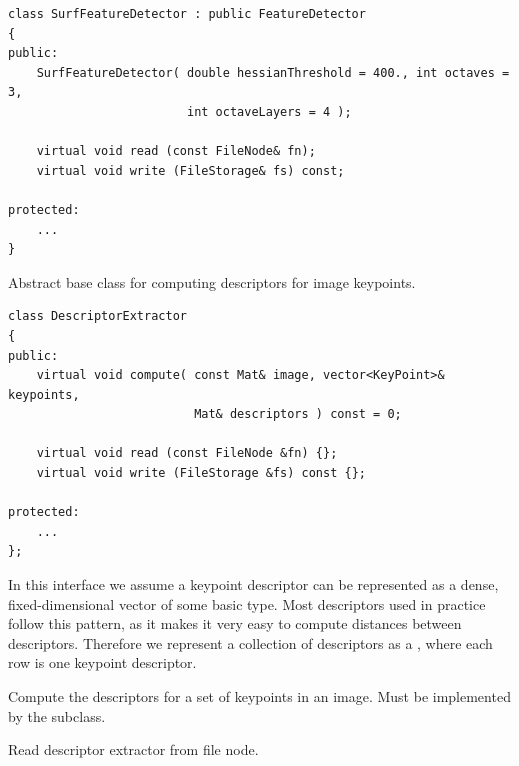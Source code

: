 \begin{lstlisting}
class SurfFeatureDetector : public FeatureDetector
{
public:
    SurfFeatureDetector( double hessianThreshold = 400., int octaves = 3,
                         int octaveLayers = 4 );
    
    virtual void read (const FileNode& fn);
    virtual void write (FileStorage& fs) const;
    
protected:
	...
}
\end{lstlisting}

Abstract base class for computing descriptors for image keypoints.

\begin{lstlisting}
class DescriptorExtractor
{
public:
    virtual void compute( const Mat& image, vector<KeyPoint>& keypoints,
                          Mat& descriptors ) const = 0;

    virtual void read (const FileNode &fn) {};
    virtual void write (FileStorage &fs) const {};

protected:
    ...
};
\end{lstlisting}
In this interface we assume a keypoint descriptor can be represented as a
dense, fixed-dimensional vector of some basic type. Most descriptors used
in practice follow this pattern, as it makes it very easy to compute
distances between descriptors. Therefore we represent a collection of
descriptors as a , where each row is one keypoint descriptor.

Compute the descriptors for a set of keypoints in an image. Must be implemented by the subclass.


\begin{description}
\end{description}

Read descriptor extractor from file node.


\begin{description}
\end{description}

